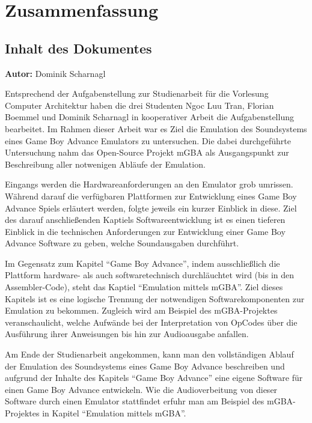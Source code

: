 \documentclass[11pt,a4paper]{scrartcl}
\newcommand{\AutorDominik} {
    \vspace{-4mm}
    \large \textbf{Autor:} Dominik Scharnagl \normalsize
    \vspace{2mm}
}
\begin{document}

\newpage
\section{Zusammenfassung} \label{Zusammenfassung}


\subsection{Inhalt des Dokumentes}
\AutorDominik

Entsprechend der Aufgabenstellung zur Studienarbeit f\"ur die Vorlesung Computer Architektur haben die drei Studenten Ngoc Luu Tran, Florian Boemmel und Dominik Scharnagl in kooperativer Arbeit die Aufgabenstellung bearbeitet. Im Rahmen dieser Arbeit war es Ziel die Emulation des Soundsystems eines Game Boy Advance Emulators zu untersuchen. Die dabei durchgef\"uhrte Untersuchung nahm das Open-Source Projekt mGBA als Ausgangspunkt zur Beschreibung aller notwenigen Abl\"aufe der Emulation.

Eingangs werden die Hardwareanforderungen an den Emulator grob umrissen. W\"ahrend darauf die verf\"ugbaren Plattformen zur Entwicklung eines Game Boy Advance Spiels erl\"autert werden,  folgte jeweils ein kurzer Einblick in diese. Ziel des darauf anschlie{\ss}enden Kaptiels Softwareentwicklung ist es einen tieferen Einblick in die technischen Anforderungen zur Entwicklung einer Game Boy Advance Software zu geben, welche Soundausgaben durchf\"uhrt.

Im Gegensatz zum Kapitel \enquote{Game Boy Advance}, indem ausschlie{\ss}lich die Plattform hardware- als auch softwaretechnisch durchl\"auchtet wird (bis in den Assembler-Code), steht das Kaptiel \enquote{Emulation mittels mGBA}. Ziel dieses Kapitels ist es eine logische Trennung der notwendigen Softwarekomponenten zur Emulation zu bekommen. Zugleich wird am Beispiel des mGBA-Projektes veranschaulicht, welche Aufw\"ande bei der Interpretation von OpCodes \"uber die Ausf\"uhrung ihrer Anweisungen bis hin zur Audioausgabe anfallen.

Am Ende der Studienarbeit angekommen, kann man den vollst\"andigen Ablauf der Emulation des Soundsystems eines Game Boy Advance beschreiben und aufgrund der Inhalte des Kapitels \enquote{Game Boy Advance} eine eigene Software f\"ur einen Game Boy Advance entwickeln. Wie die Audioverbeitung von dieser Software durch einen Emulator stattfindet erfuhr man am Beispiel des mGBA-Projektes in Kapitel \enquote{Emulation mittels mGBA}.
\end{document}
